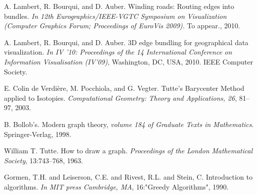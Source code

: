\begin{thebibliography}{}

 A. Lambert, R. Bourqui, and D. Auber. Winding roads: Routing edges
into bundles. \emph{In 12th Eurographics/IEEE-VGTC Symposium on
Visualization (Computer Graphics Forum; Proceedings of EuroVis
2009).} To appear., 2010.

 A. Lambert, R. Bourqui, and D. Auber. 3D edge bundling for
geographical data visualization. \emph{In IV ’10: Proceedings of the 14
International Conference on Information Visualisation (IV’09)},
Washington, DC, USA, 2010. IEEE Computer Society.

 E. Colin de Verdière, M. Pocchiola, and G. Vegter. Tutte's Barycenter Method applied to Isotopies. \emph{Computational Geometry: Theory and Applications, 26}, 81–97, 2003.

 B. Bollob's. Modern graph theory, \emph{volume 184 of Graduate Texts in Mathematics}. Springer-Verlag, 1998.

 William T. Tutte. How to draw a graph. \emph{Proceedings of the London Mathematical Society}, 13:743–768, 1963.

 Gormen, T.H. and Leiserson, C.E. and Rivest, R.L. and Stein, C. Introduction to algorithms. \emph{In MIT press Cambridge, MA}, 16:"Greedy Algorithms", 1990.





   
\end{thebibliography}
